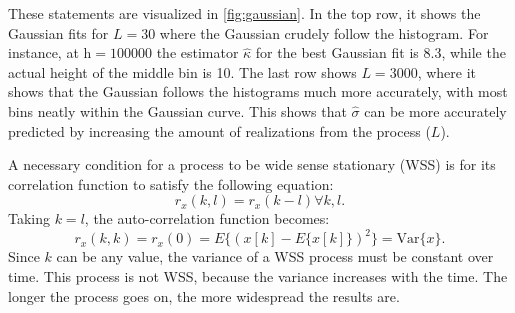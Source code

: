 \documentclass[12pt]{article}
\begin{document}
These statements are visualized in \autoref{fig:gaussian}. In the top row, it shows the Gaussian fits for $L = 30$ where the Gaussian crudely follow the histogram. For instance, at $\text{h} = 100000$ the estimator $\hat{\kappa}$ for the best Gaussian fit is 8.3, while the actual height of the middle bin is 10. The last row shows $L = 3000$, where it shows that the Gaussian follows the histograms much more accurately, with most bins neatly within the Gaussian curve. This shows that $\hat{\sigma}$ can be more accurately predicted by increasing the amount of realizations from the process ($L$). 

A necessary condition for a process to be wide sense stationary (WSS) is for its correlation function to satisfy the following equation:
\begin{equation}\label{WSScondition}
r_x(k,l) = r_x(k-l) \forall k,l. 
\end{equation}
Taking $k=l$, the auto-correlation function becomes:
\begin{equation}
r_x(k,k) = r_x(0) = E\{(x[k]-E\{x[k]\})^2\} = \text{Var}\{x\}.
\end{equation}
Since $k$ can be any value, the variance of a WSS process must be constant over time. This process is not WSS, because the variance increases with the time. The longer the process goes on, the more widespread the results are.
\end{document}

